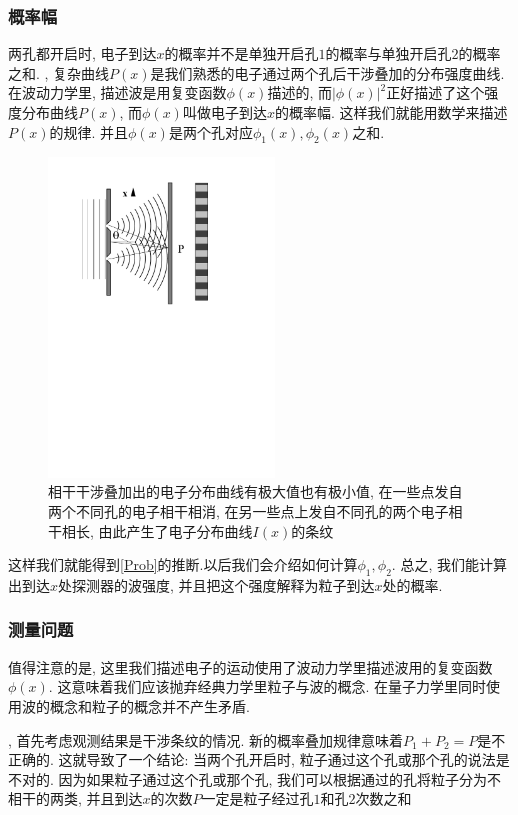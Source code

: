 \documentclass[a4paper,11pt]{article}
\theoremstyle{mystyle}
\begin{document}
\subsubsection{概率幅}
两孔都开启时, 电子到达$x$的概率并不是单独开启孔$1$的概率与单独开启孔$2$的概率之和.
, 复杂曲线$P(x)$是我们熟悉的电子通过两个孔后干涉叠加的分布强度曲线. 在波动力学里, 描述波是用复变函数$\phi(x)$描述的, 而$|\phi(x)|^2$正好描述了这个强度分布曲线$P(x)$, 而$\phi(x)$叫做电子到达$x$的概率幅. 这样我们就能用数学来描述$P(x)$的规律. 并且$\phi(x)$是两个孔对应$\phi_1(x),\phi_2(x)$之和.
\begin{figure}[H]
  \centering
  \includegraphics[width=6cm]{fig5.pdf}
  \caption{相干干涉叠加出的电子分布曲线有极大值也有极小值, 在一些点发自两个不同孔的电子相干相消, 在另一些点上发自不同孔的两个电子相干相长, 由此产生了电子分布曲线$I(x)$的条纹}\label{double slit 2}
\end{figure}
这样我们就能得到\ref{Prob}的推断.以后我们会介绍如何计算$\phi_1,\phi_2$. 总之, 我们能计算出到达$x$处探测器的波强度, 并且把这个强度解释为粒子到达$x$处的概率.
\subsubsection{测量问题}
值得注意的是, 这里我们描述电子的运动使用了波动力学里描述波用的复变函数$\phi(x)$. 这意味着我们应该抛弃经典力学里粒子与波的概念. 在量子力学里同时使用波的概念和粒子的概念并不产生矛盾.

, 首先考虑观测结果是干涉条纹的情况. 新的概率叠加规律意味着$P_1+P_2=P$是不正确的. 这就导致了一个结论: 当两个孔开启时, 粒子通过这个孔或那个孔的说法是不对的. 因为如果粒子通过这个孔或那个孔, 我们可以根据通过的孔将粒子分为不相干的两类, 并且到达$x$的次数$P$一定是粒子经过孔$1$和孔$2$次数之和
\end{document}
